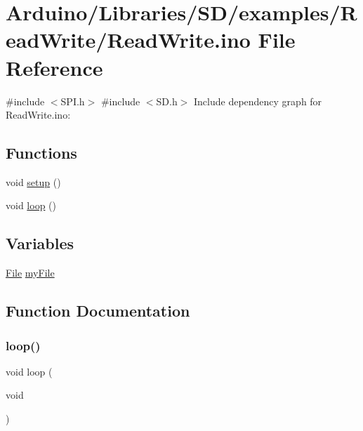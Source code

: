 \hypertarget{_read_write_8ino}{}\section{Arduino/\+Libraries/\+S\+D/examples/\+Read\+Write/\+Read\+Write.ino File Reference}
\label{_read_write_8ino}
{\ttfamily \#include $<$S\+P\+I.\+h$>$}\newline
{\ttfamily \#include $<$S\+D.\+h$>$}\newline
Include dependency graph for Read\+Write.\+ino\+:
\subsection*{Functions}
\begin{DoxyCompactItemize}
\item 
void \hyperlink{_read_write_8ino_a4fc01d736fe50cf5b977f755b675f11d}{setup} ()
\item 
void \hyperlink{_read_write_8ino_afe461d27b9c48d5921c00d521181f12f}{loop} ()
\end{DoxyCompactItemize}
\subsection*{Variables}
\begin{DoxyCompactItemize}
\item 
\hyperlink{class_s_d_lib_1_1_file}{File} \hyperlink{_read_write_8ino_a8eb13a6b9ea8026221cb3a45a822526a}{my\+File}
\end{DoxyCompactItemize}


\subsection{Function Documentation}
\mbox{\label{_read_write_8ino_afe461d27b9c48d5921c00d521181f12f}} 
\subsubsection{\texorpdfstring{loop()}{loop()}}
{\footnotesize\ttfamily void loop (\begin{DoxyParamCaption}\item[{void}]{ }\end{DoxyParamCaption})}

